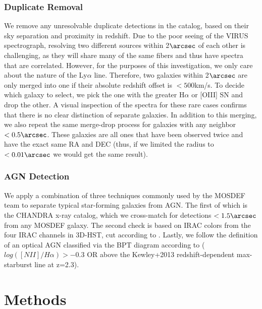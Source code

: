 \documentclass[linenumbers,amsmath,trackchanges,preprint2]{aastex702}
\begin{document}
\subsubsection{Duplicate Removal}
\par We remove any unresolvable duplicate detections in the catalog, based on their sky separation and proximity in redshift. Due to the poor seeing of the VIRUS spectrograph, resolving two different sources within 2$\arcsec$ of each other is challenging, as they will share many of the same fibers and thus have spectra that are correlated. However, for the purposes of this investigation, we only care about the nature of the Ly$\alpha$ line. Therefore, two galaxies within 2$\arcsec$ are only merged into one if their absolute redshift offset is $<500$km/s. To decide which galaxy to select, we pick the one with the greater H$\alpha$ or [OIII] SN and drop the other. A visual inspection of the spectra for these rare cases confirms that there is no clear distinction of separate galaxies. In addition to this merging, we also repeat the same merge-drop process for galaxies with any neighbor $<0.5\arcsec$. These galaxies are all ones that have been observed twice and have the exact same RA and DEC (thus, if we limited the radius to $<0.01\arcsec$ we would get the same result).
\subsubsection{AGN Detection}
\par We apply a combination of three techniques commonly used by the MOSDEF team to separate typical star-forming galaxies from AGN. The first of which is the CHANDRA x-ray catalog, which we cross-match for detections $<1.5\arcsec$ from any MOSDEF galaxy. The second check is based on IRAC colors from the four IRAC channels in 3D-HST, cut according to \cite{donley2012}. Lastly, we follow the definition of an optical AGN classified via the BPT diagram according to \cite{melendez2014} ($log([NII]/H\alpha) > -0.3$ OR above the Kewley+2013 redshift-dependent max-starburst line at z=2.3).


\section{Methods}
\end{document}

